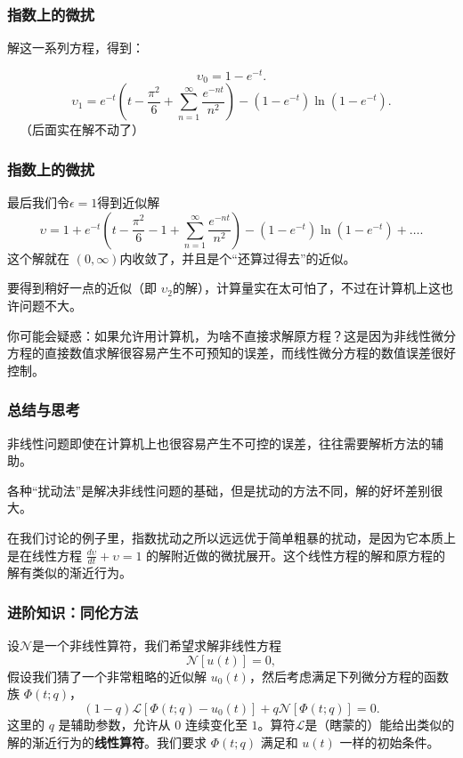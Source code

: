 \documentclass[CJK]{beamer}
\begin{document}
\begin{frame}
  \frametitle{指数上的微扰}
  解这一系列方程，得到：

  $$ \upsilon_0 = 1-e^{-t}.$$
  $$ \upsilon_1 = e^{-t}\left(t-\frac{\pi^2}{6}+\sum_{n=1}^\infty\frac{e^{-nt}}{n^2}\right)-\left(1-e^{-t}\right)\ln\left(1-e^{-t}\right).$$  
 \ \ （后面实在解不动了）
\end{frame}


\begin{frame}
  \frametitle{指数上的微扰}
  最后我们令$\epsilon=1$得到近似解
  $$ \upsilon = 1+e^{-t}\left(t-\frac{\pi^2}{6}-1+\sum_{n=1}^\infty\frac{e^{-nt}}{n^2}\right)-\left(1-e^{-t}\right)\ln\left(1-e^{-t}\right)+\ldots.$$
  这个解就在 $(0,\infty)$内收敛了，并且是个“还算过得去”的近似。

  要得到稍好一点的近似（即 $\upsilon_2$的解），计算量实在太可怕了，不过在计算机上这也许问题不大。

  {\scriptsize 你可能会疑惑：如果允许用计算机，为啥不直接求解原方程？这是因为非线性微分方程的直接数值求解很容易产生不可预知的误差，而线性微分方程的数值误差很好控制。}
  
\end{frame}


\begin{frame}
  \frametitle{总结与思考}
  \bitem
\item{非线性问题即使在计算机上也很容易产生不可控的误差，往往需要解析方法的辅助。}
\item{各种“扰动法”是解决非线性问题的基础，但是扰动的方法不同，解的好坏差别很大。}
\item{在我们讨论的例子里，指数扰动之所以远远优于简单粗暴的扰动，是因为它本质上是在线性方程 $\frac{d\upsilon}{dt} + \upsilon=1$ 的解附近做的微扰展开。这个线性方程的解和原方程的解有类似的渐近行为。}  
  \eitem
  
\end{frame}

\begin{frame}
  \frametitle{进阶知识：同伦方法}
  设$\mathcal{N}$是一个非线性算符，我们希望求解非线性方程
  $$\mathcal{N}\left[u(t)\right]= 0,  $$
  假设我们猜了一个非常粗略的近似解 $u_0(t)$，然后考虑满足下列微分方程的函数族 $\Phi(t; q)$，
  $$(1-q)\mathcal{L}\left[\Phi(t;q)-u_0(t)\right] + q\mathcal{N}\left[\Phi(t;q)\right] = 0.$$
  这里的 $q$ 是辅助参数，允许从 $0$ 连续变化至  $1$。算符$\mathcal{L}$是（瞎蒙的）能给出类似的解的渐近行为的{\bf 线性算符}。我们要求 $\Phi(t;q)$ 满足和 $u(t)$ 一样的初始条件。

\end{frame}
\end{document}

